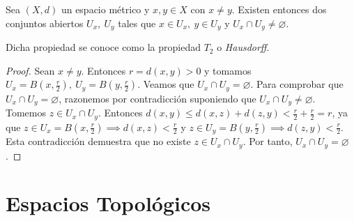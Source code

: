 \begin{properties}
  Sea $(X,d)$ un espacio métrico y $x,y \in X$ con $x \neq y$. Existen entonces dos conjuntos abiertos $U_x,\ U_y$ tales que $x \in U_x,\ y \in U_y$ y $U_x \cap U_y \neq \varnothing $.
\end{properties}
\begin{ndef}[Hausdorff]
  Dicha propiedad se conoce como la propiedad $T_2$ o \textit{Hausdorff}.
\end{ndef}
\begin{proof}
  Sean $x \neq y$. Entonces $r=d(x,y)>0$ y tomamos $U_x = B(x,\frac{r}{2}),\ U_y=B(y,\frac{r}{2})$. Veamos que $U_x \cap U_y=\varnothing $. Para comprobar que $U_x \cap U_y=\varnothing $, razonemos por contradicción suponiendo que $U_x \cap U_y \neq \varnothing $. Tomemos $z \in U_x \cap U_y$. Entonces $d(x,y) \le  d(x,z) + d(z,y) < \frac{r}{2} + \frac{r}{2} = r$, ya que $z \in U_x=B(x,\frac{r}{2}) \implies d(x,z)<\frac{r}{2}$ y $z \in U_y=B(y,\frac{r}{2}) \implies d(z,y)<\frac{r}{2}$. Esta contradicción demuestra que no existe $z \in U_x \cap U_y$. Por tanto, $U_x \cap U_y = \varnothing $.
\end{proof}

\newpage
\section{Espacios Topológicos}

